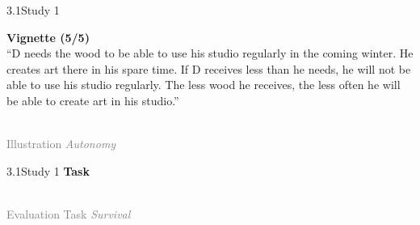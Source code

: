 \documentclass[xcolor=table,9pt,aspectratio=169]{beamer}
\begin{document}
\begin{frame}{\vspace*{10mm}3.1\hspace*{1em}Study 1}
\begin{multicols}{2}
   \textbf{Vignette (5/5)}\\
   \medskip
   \enquote{D needs the wood to be able to use his studio regularly in the coming winter.
   He creates art there in his spare time.
   If D receives less than he needs, he will not be able to use his studio regularly.
   The less wood he receives, the less often he will be able to create art in his studio.}
   \vfill
   \begin{center}
      \\
      \textcolor{gray}{Illustration \textit{Autonomy}}
   \end{center}
\end{multicols}
\end{frame}


\begin{frame}{\vspace*{10mm}3.1\hspace*{1em}Study 1}
\textbf{Task}\\
\medskip
\begin{center}
   \\
   \textcolor{gray}{Evaluation Task \textit{Survival}}
\end{center}
\end{frame}
\end{document}
